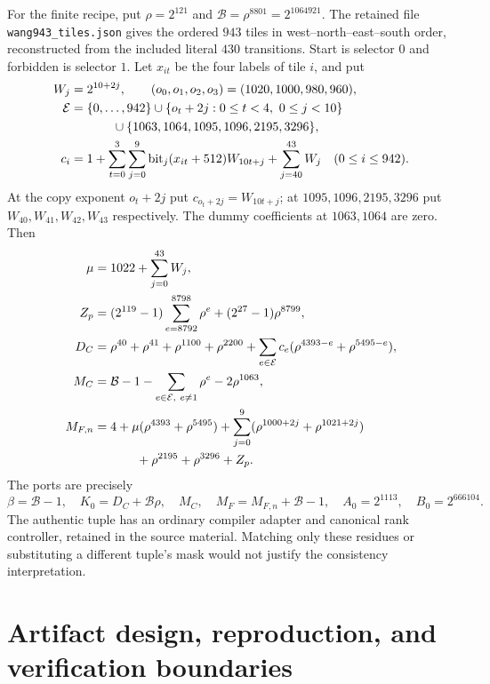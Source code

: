 \documentclass[11pt]{article}
\theoremstyle{definition}
\theoremstyle{remark}
\begin{document}
For the finite recipe, put $\rho=2^{121}$ and
$\mathcal B=\rho^{8801}=2^{1064921}$. The retained file
\texttt{wang943\_tiles.json} gives the ordered $943$ tiles in
west--north--east--south order, reconstructed from the included
literal $430$ transitions. Start is selector $0$ and forbidden is
selector $1$. Let $x_{it}$ be the four labels of tile $i$, and put
\begin{align*}
 W_j&=2^{10+2j},\qquad (o_0,o_1,o_2,o_3)=(1020,1000,980,960),\\
 \mathcal E&=\{0,\ldots,942\}\cup
 \{o_t+2j:0\le t<4,\ 0\le j<10\}\\
 &\hspace{12mm}\cup\{1063,1064,1095,1096,2195,3296\},\\
 c_i&=1+\sum_{t=0}^3\sum_{j=0}^9
       \operatorname{bit}_j(x_{it}+512)W_{10t+j}
       +\sum_{j=40}^{43}W_j\quad(0\le i\le942).
\end{align*}
At the copy exponent $o_t+2j$ put $c_{o_t+2j}=W_{10t+j}$; at
$1095,1096,2195,3296$ put $W_{40},W_{41},W_{42},W_{43}$ respectively.
The dummy coefficients at $1063,1064$ are zero. Then
\begin{align*}
 \mu&=1022+\sum_{j=0}^{43}W_j,\\
 Z_p&=(2^{119}-1)\sum_{e=8792}^{8798}\rho^e
                  +(2^{27}-1)\rho^{8799},\\
 D_C&=\rho^{40}+\rho^{41}+\rho^{1100}+\rho^{2200}
       +\sum_{e\in\mathcal E}c_e(\rho^{4393-e}+\rho^{5495-e}),\\
 M_C&=\mathcal B-1-\sum_{e\in\mathcal E,\ e\ne1}\rho^e
                         -2\rho^{1063},\\
 M_{F,n}&=4+\mu(\rho^{4393}+\rho^{5495})
       +\sum_{j=0}^9(\rho^{1000+2j}+\rho^{1021+2j})\\
       &\hspace{12mm}+\rho^{2195}+\rho^{3296}+Z_p.
\end{align*}
The ports are precisely
\[
 \beta=\mathcal B-1,\quad K_0=D_C+\mathcal B\rho,
 \quad M_C,\quad M_F=M_{F,n}+\mathcal B-1,
 \quad A_0=2^{1113},\quad B_0=2^{666104}.
\]
The authentic tuple has an ordinary compiler adapter and canonical
rank controller, retained in the source material. Matching only
these residues or substituting a different tuple's mask would not
justify the consistency interpretation.

\section{Artifact design, reproduction, and verification boundaries}
\label{sec:verification}
\end{document}

